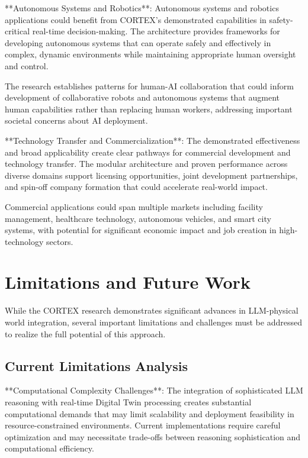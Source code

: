 **Autonomous Systems and Robotics**:
Autonomous systems and robotics applications could benefit from CORTEX's demonstrated capabilities in safety-critical real-time decision-making. The architecture provides frameworks for developing autonomous systems that can operate safely and effectively in complex, dynamic environments while maintaining appropriate human oversight and control.

The research establishes patterns for human-AI collaboration that could inform development of collaborative robots and autonomous systems that augment human capabilities rather than replacing human workers, addressing important societal concerns about AI deployment.

**Technology Transfer and Commercialization**:
The demonstrated effectiveness and broad applicability create clear pathways for commercial development and technology transfer. The modular architecture and proven performance across diverse domains support licensing opportunities, joint development partnerships, and spin-off company formation that could accelerate real-world impact.

Commercial applications could span multiple markets including facility management, healthcare technology, autonomous vehicles, and smart city systems, with potential for significant economic impact and job creation in high-technology sectors.

\section{Limitations and Future Work}

While the CORTEX research demonstrates significant advances in LLM-physical world integration, several important limitations and challenges must be addressed to realize the full potential of this approach.

\subsection{Current Limitations Analysis}

**Computational Complexity Challenges**:
The integration of sophisticated LLM reasoning with real-time Digital Twin processing creates substantial computational demands that may limit scalability and deployment feasibility in resource-constrained environments. Current implementations require careful optimization and may necessitate trade-offs between reasoning sophistication and computational efficiency.

